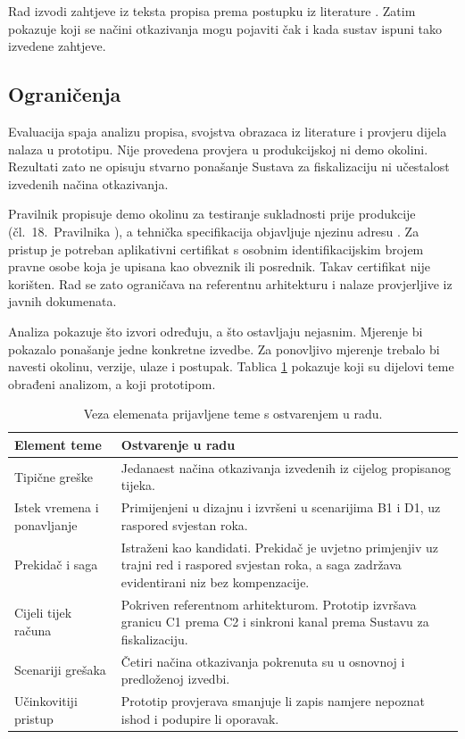 Rad izvodi zahtjeve iz teksta propisa prema postupku iz literature
\cite{breaux2008regulatory}. Zatim pokazuje koji se načini otkazivanja mogu
pojaviti čak i kada sustav ispuni tako izvedene zahtjeve.

\subsection{Ograničenja}
\label{sec:ogranicenja}

Evaluacija spaja analizu propisa, svojstva obrazaca iz literature i provjeru
dijela nalaza u prototipu. Nije provedena provjera u produkcijskoj ni demo
okolini. Rezultati zato ne opisuju stvarno ponašanje Sustava za fiskalizaciju
ni učestalost izvedenih načina otkazivanja.

Pravilnik propisuje demo okolinu za testiranje sukladnosti prije produkcije
(čl.~18.\ Pravilnika \cite{nn2026pravilnikeracun}), a tehnička specifikacija
objavljuje njezinu adresu \cite{pu2026tehspec}. Za pristup je potreban
aplikativni certifikat s osobnim identifikacijskim brojem pravne osobe koja
je upisana kao obveznik ili posrednik. Takav certifikat nije korišten. Rad se
zato ograničava na referentnu arhitekturu i nalaze provjerljive iz javnih
dokumenata.

Analiza pokazuje što izvori određuju, a što ostavljaju nejasnim. Mjerenje bi
pokazalo ponašanje jedne konkretne izvedbe. Za ponovljivo mjerenje trebalo bi
navesti okolinu, verzije, ulaze i postupak. Tablica \ref{tab:sljedivost}
pokazuje koji su dijelovi teme obrađeni analizom, a koji prototipom.

\begin{table}[htbp]
\centering
\caption[Sljedivost prijavljene teme]{Veza elemenata prijavljene teme s
ostvarenjem u radu.}
\label{tab:sljedivost}
\small
\begin{tabular}{@{}p{}p{}@{}}
\toprule
Element teme & Ostvarenje u radu \\
\midrule
Tipične greške & Jedanaest načina otkazivanja izvedenih iz cijelog propisanog tijeka. \\
Istek vremena i ponavljanje & Primijenjeni u dizajnu i izvršeni u scenarijima B1 i D1, uz raspored svjestan roka. \\
Prekidač i saga & Istraženi kao kandidati. Prekidač je uvjetno primjenjiv uz trajni red i raspored svjestan roka, a saga zadržava evidentirani niz bez kompenzacije. \\
Cijeli tijek računa & Pokriven referentnom arhitekturom. Prototip izvršava granicu C1 prema C2 i sinkroni kanal prema Sustavu za fiskalizaciju. \\
Scenariji grešaka & Četiri načina otkazivanja pokrenuta su u osnovnoj i predloženoj izvedbi. \\
Učinkovitiji pristup & Prototip provjerava smanjuje li zapis namjere nepoznat ishod i podupire li oporavak. \\
\bottomrule
\end{tabular}
\end{table}

